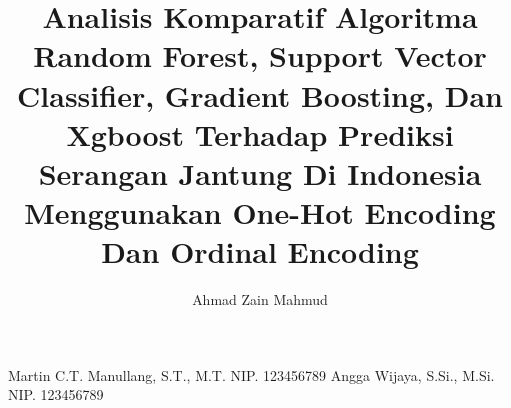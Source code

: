 \title{Analisis Komparatif Algoritma Random Forest, Support Vector Classifier, Gradient Boosting, Dan Xgboost Terhadap Prediksi Serangan Jantung Di Indonesia Menggunakan One-Hot Encoding Dan Ordinal Encoding} 	%
\author{Ahmad Zain Mahmud}		%
\dosbingA%
    {Martin C.T. Manullang, S.T., M.T.}%
    {NIP. 123456789}				%
\dosbingB%
    {Angga Wijaya, S.Si., M.Si.}%
    {NIP. 123456789}				%

\setcounter{page}{0}











\tableofcontents
\listoffigures
\listoftables
